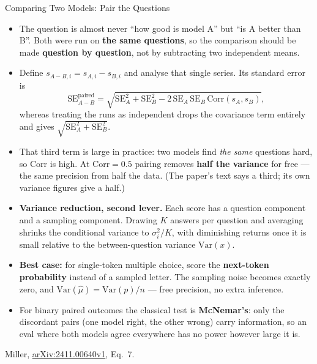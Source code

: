 \begin{frame}[allowframebreaks]{Comparing Two Models: Pair the Questions}
  \begin{itemize}\footnotesize\itemsep0.3em
    \item[\textcolor{red}{$\blacktriangleright$}] The question is almost never ``how good is model A'' but ``is A better than B''. Both were run on \textbf{the same questions}, so the comparison should be made \textbf{question by question}, not by subtracting two independent means.
    \item[\textcolor{red}{$\blacktriangleright$}] Define $s_{A-B,i} = s_{A,i} - s_{B,i}$ and analyse that single series. Its standard error is
      \[
        \mathrm{SE}_{A-B}^{\text{paired}}
          = \sqrt{\mathrm{SE}_A^2 + \mathrm{SE}_B^2 - 2\,\mathrm{SE}_A\,\mathrm{SE}_B\,\mathrm{Corr}(s_A, s_B)},
      \]
      whereas treating the runs as independent drops the covariance term entirely and gives $\sqrt{\mathrm{SE}_A^2 + \mathrm{SE}_B^2}$.
    \item[\textcolor{red}{$\blacktriangleright$}] That third term is large in practice: two models find \textit{the same} questions hard, so $\mathrm{Corr}$ is high. At $\mathrm{Corr} = 0.5$ pairing removes \textbf{half the variance} for free --- the same precision from half the data. (The paper's text says a third; its own variance figures give a half.)
    \item[\textcolor{red}{$\blacktriangleright$}] \textbf{Variance reduction, second lever.} Each score has a question component and a sampling component. Drawing $K$ answers per question and averaging shrinks the conditional variance to $\sigma_i^2/K$, with diminishing returns once it is small relative to the between-question variance $\mathrm{Var}(x)$.
    \item[\textcolor{red}{$\blacktriangleright$}] \textbf{Best case:} for single-token multiple choice, score the \textbf{next-token probability} instead of a sampled letter. The sampling noise becomes exactly zero, and $\mathrm{Var}(\hat{\mu}) = \mathrm{Var}(p)/n$ --- free precision, no extra inference.
    \item[\textcolor{red}{$\blacktriangleright$}] For binary paired outcomes the classical test is \textbf{McNemar's}: only the discordant pairs (one model right, the other wrong) carry information, so an eval where both models agree everywhere has no power however large it is.
  \end{itemize}
  \vspace{0.1em}
  {\scriptsize Miller, \href{https://arxiv.org/abs/2411.00640v1}{arXiv:2411.00640v1}, Eq.~7.}
\end{frame}

